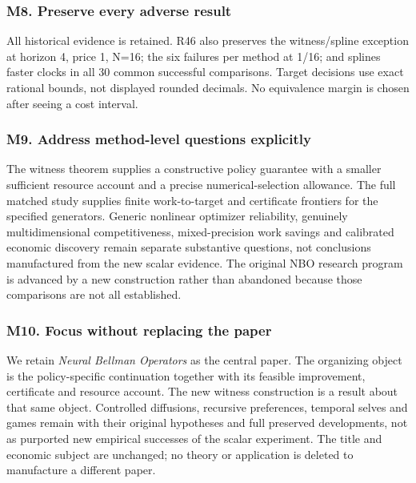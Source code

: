 \documentclass[ecta,nameyear,draft]{econsocart}
\begin{document}
\hypertarget{m8-preserve-every-adverse-result}{%
\subsubsection{M8. Preserve every adverse
result}\label{m8-preserve-every-adverse-result}}

All historical evidence is retained. R46 also preserves the
witness/spline exception at horizon 4, price 1, N=16; the six failures
per method at 1/16; and spline\textquotesingle s faster clocks in all 30
common successful comparisons. Target decisions use exact rational
bounds, not displayed rounded decimals. No equivalence margin is chosen
after seeing a cost interval.

\hypertarget{m9-address-method-level-questions-explicitly}{%
\subsubsection{M9. Address method-level questions
explicitly}\label{m9-address-method-level-questions-explicitly}}

The witness theorem supplies a constructive policy guarantee with a
smaller sufficient resource account and a precise numerical-selection
allowance. The full matched study supplies finite work-to-target and
certificate frontiers for the specified generators. Generic nonlinear
optimizer reliability, genuinely multidimensional competitiveness,
mixed-precision work savings and calibrated economic discovery remain
separate substantive questions, not conclusions manufactured from the
new scalar evidence. The original NBO research program is advanced by a
new construction rather than abandoned because those comparisons are not
all established.

\hypertarget{m10-focus-without-replacing-the-paper}{%
\subsubsection{M10. Focus without replacing the
paper}\label{m10-focus-without-replacing-the-paper}}

We retain \emph{Neural Bellman Operators} as the central paper. The
organizing object is the policy-specific continuation together with its
feasible improvement, certificate and resource account. The new witness
construction is a result about that same object. Controlled diffusions,
recursive preferences, temporal selves and games remain with their
original hypotheses and full preserved developments, not as purported
new empirical successes of the scalar experiment. The title and economic
subject are unchanged; no theory or application is deleted to
manufacture a different paper.
\end{document}
